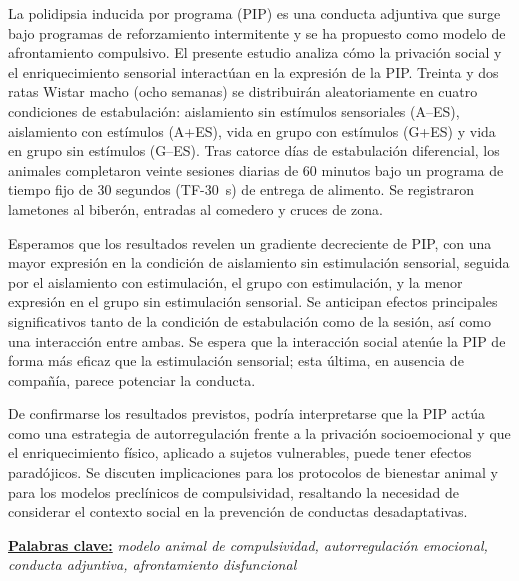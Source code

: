\documentclass[12pt,a4paper]{article}
\begin{document}
    \begin{center}
    \begin{minipage}{0.9\textwidth}
    \noindent
    La polidipsia inducida por programa (PIP) es una conducta adjuntiva que surge bajo programas de reforzamiento intermitente y se ha propuesto como modelo de afrontamiento compulsivo. El presente estudio analiza cómo la privación social y el enriquecimiento sensorial interactúan en la expresión de la PIP. Treinta y dos ratas Wistar macho (ocho semanas) se distribuirán aleatoriamente en cuatro condiciones de estabulación: aislamiento sin estímulos sensoriales (A--ES), aislamiento con estímulos (A+ES), vida en grupo con estímulos (G+ES) y vida en grupo sin estímulos (G--ES). Tras catorce días de estabulación diferencial, los animales completaron veinte sesiones diarias de 60 minutos bajo un programa de tiempo fijo de 30 segundos (TF-30~s) de entrega de alimento. Se registraron lametones al biberón, entradas al comedero y cruces de zona.
    
    Esperamos que los resultados revelen un gradiente decreciente de PIP, con una mayor expresión en la condición de aislamiento sin estimulación sensorial, seguida por el aislamiento con estimulación, el grupo con estimulación, y la menor expresión en el grupo sin estimulación sensorial. Se anticipan efectos principales significativos tanto de la condición de estabulación como de la sesión, así como una interacción entre ambas. Se espera que la interacción social atenúe la PIP de forma más eficaz que la estimulación sensorial; esta última, en ausencia de compañía, parece potenciar la conducta.

    De confirmarse los resultados previstos, podría interpretarse que la PIP actúa como una estrategia de autorregulación frente a la privación socioemocional y que el enriquecimiento físico, aplicado a sujetos vulnerables, puede tener efectos paradójicos. Se discuten implicaciones para los protocolos de bienestar animal y para los modelos preclínicos de compulsividad, resaltando la necesidad de considerar el contexto social en la prevención de conductas desadaptativas.
    
    \vspace{2mm}
    \noindent
    \underline{\textbf{Palabras clave:}} \textit{modelo animal de compulsividad, autorregulación emocional, conducta adjuntiva, afrontamiento disfuncional}
    \end{minipage}
    \end{center}
    
    \vspace{5mm}
    
\end{document}
